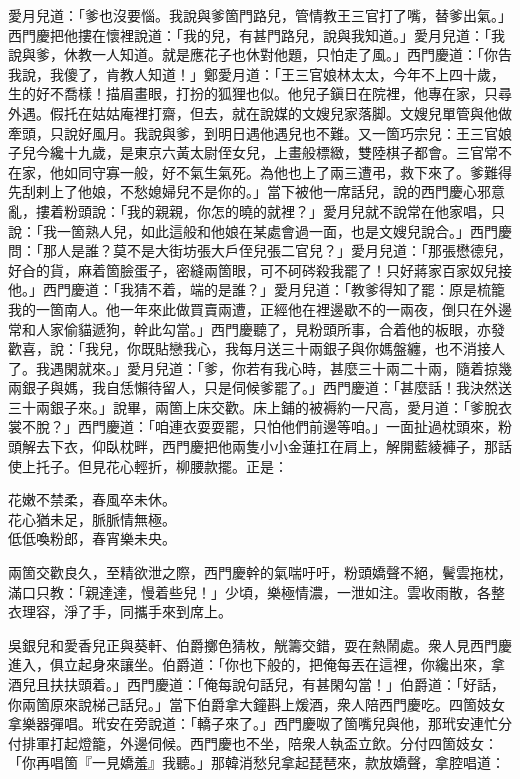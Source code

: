 愛月兒道：「爹也沒要惱。我說與爹箇門路兒，管情教王三官打了嘴，替爹出氣。」西門慶把他摟在懷裡說道：「我的兒，有甚門路兒，說與我知道。」愛月兒道：「我說與爹，休教一人知道。就是應花子也休對他題，只怕走了風。」西門慶道：「你告我說，我傻了，肯教人知道！」鄭愛月道：「王三官娘林太太，今年不上四十歲，生的好不喬樣！描眉畫眼，打扮的狐狸也似。{}他兒子鎭日在院裡，他專在家，只尋外遇。假托在姑姑庵裡打齋，但去，就在說媒的文嫂兒家落脚。文嫂兒單管與他做牽頭，只說好風月。我說與爹，到明日遇他遇兒也不難。又一箇巧宗兒：王三官娘子兒今纔十九歲，是東京六黃太尉侄女兒，上畫般標緻，雙陸棋子都會。三官常不在家，他如同守寡一般，好不氣生氣死。為他也上了兩三遭弔，救下來了。爹難得先刮剌上了他娘，不愁媳婦兒不是你的。」{}當下被他一席話兒，說的西門慶心邪意亂，摟着粉頭說：「我的親親，你怎的曉的就裡？」愛月兒就不說常在他家唱，只說：「我一箇熟人兒，如此這般和他娘在某處會過一面，也是文嫂兒說合。」西門慶問：「那人是誰？莫不是大街坊張大戶侄兒張二官兒？」{}愛月兒道：「那張懋德兒，好㒲的貨，麻着箇臉蛋子，密縫兩箇眼，可不砢硶殺我罷了！{}只好蔣家百家奴兒接他。」西門慶道：「我猜不着，端的是誰？」愛月兒道：「教爹得知了罷：原是梳籠我的一箇南人。他一年來此做買賣兩遭，正經他在裡邊歇不的一兩夜，倒只在外邊常和人家偷貓遞狗，幹此勾當。」西門慶聽了，見粉頭所事，合着他的板眼，亦發歡喜，說：「我兒，你既貼戀我心，我每月送三十兩銀子與你媽盤纏，也不消接人了。我遇閑就來。」愛月兒道：「爹，你若有我心時，甚麼三十兩二十兩，隨着掠幾兩銀子與媽，我自恁懶待留人，只是伺候爹罷了。」西門慶道：「甚麼話！我決然送三十兩銀子來。」說畢，兩箇上床交歡。床上鋪的被褥約一尺高，愛月道：「爹脫衣裳不脫？」西門慶道：「咱連衣耍耍罷，只怕他們前邊等咱。」一面扯過枕頭來，粉頭解去下衣，仰臥枕畔，西門慶把他兩隻小小金蓮扛在肩上，解開藍綾褲子，那話使上托子。但見花心輕折，柳腰款擺。正是：

\begin{myquote} 
花嫩不禁柔，春風卒未休。\\花心猶未足，脈脈情無極。\\低低喚粉郎，春宵樂未央。{}
\end{myquote} 

兩箇交歡良久，至精欲泄之際，西門慶幹的氣喘吁吁，粉頭嬌聲不絕，鬢雲拖枕，滿口只教：「親達達，慢着些兒！」少頃，樂極情濃，一泄如注。雲收雨散，各整衣理容，淨了手，同攜手來到席上。

吳銀兒和愛香兒正與葵軒、伯爵擲色猜枚，觥籌交錯，耍在熱鬧處。衆人見西門慶進入，俱立起身來讓坐。伯爵道：「你也下般的，把俺每丟在這裡，你纔出來，拿酒兒且扶扶頭着。」西門慶道：「俺每說句話兒，有甚閑勾當！」伯爵道：「好話，你兩箇原來說梯己話兒。」當下伯爵拿大鐘斟上煖酒，衆人陪西門慶吃。四箇妓女拿樂器彈唱。玳安在旁說道：「轎子來了。」西門慶呶了箇嘴兒與他，那玳安連忙分付排軍打起燈籠，外邊伺候。西門慶也不坐，陪衆人執盃立飲。分付四箇妓女：「你再唱箇『一見嬌羞』我聽。」那韓消愁兒拿起琵琶來，款放嬌聲，拿腔唱道：


